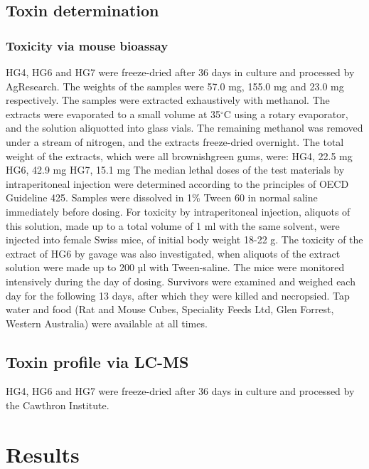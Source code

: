 \documentclass[12pt]{article}
\begin{document}
\subsection{Toxin determination}

\subsubsection{Toxicity via mouse bioassay}
HG4, HG6 and HG7 were freeze-dried after 36 days in culture and processed by AgResearch. The weights of the samples were 57.0 mg, 155.0 mg and 23.0 mg respectively. The samples were extracted exhaustively with methanol. The extracts were evaporated to a small volume at 35$^{\circ}$C using a rotary evaporator, and the solution aliquotted into glass vials. The remaining methanol was removed under a stream of nitrogen, and the extracts freeze-dried overnight. The total weight of the extracts, which were all brownishgreen gums, were: HG4, 22.5 mg HG6, 42.9 mg HG7, 15.1 mg The median lethal doses of the test materials by intraperitoneal injection were determined according to the principles of OECD Guideline 425. Samples were dissolved in 1\% Tween 60 in normal saline immediately before dosing. For toxicity by intraperitoneal injection, aliquots of this solution, made up to a total volume of 1 ml with the same solvent, were injected into female Swiss mice, of initial body weight 18-22 g. The toxicity of the extract of HG6 by gavage was also investigated, when aliquots of the extract solution were made up to 200 µl with Tween-saline. The mice were monitored intensively during the day of dosing. Survivors were examined and weighed each day for the following 13 days, after which they were killed and necropsied. Tap water and food (Rat and Mouse Cubes, Speciality Feeds Ltd, Glen Forrest, Western Australia) were available at all times.

\subsection{Toxin profile via LC-MS}
HG4, HG6 and HG7 were freeze-dried after 36 days in culture and processed by the Cawthron Institute.
\newpage
\section{Results}
\end{document}
